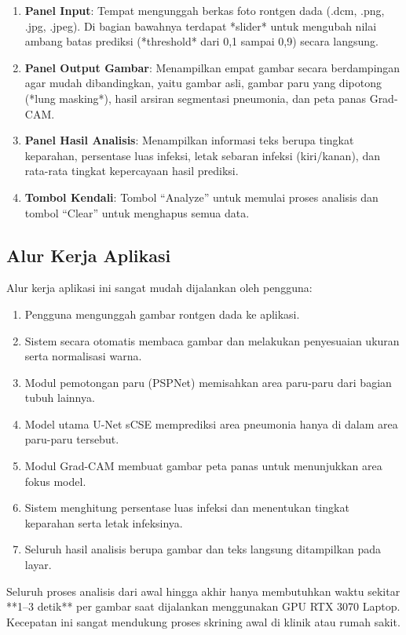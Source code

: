 \documentclass[12pt,a4paper,oneside]{book}
\begin{document}
\begin{enumerate}
  \item \textbf{Panel Input}: Tempat mengunggah berkas foto rontgen dada (.dcm, .png, .jpg, .jpeg). Di bagian bawahnya terdapat *slider* untuk mengubah nilai ambang batas prediksi (*threshold* dari 0,1 sampai 0,9) secara langsung.
  \item \textbf{Panel Output Gambar}: Menampilkan empat gambar secara berdampingan agar mudah dibandingkan, yaitu gambar asli, gambar paru yang dipotong (*lung masking*), hasil arsiran segmentasi pneumonia, dan peta panas Grad-CAM.
  \item \textbf{Panel Hasil Analisis}: Menampilkan informasi teks berupa tingkat keparahan, persentase luas infeksi, letak sebaran infeksi (kiri/kanan), dan rata-rata tingkat kepercayaan hasil prediksi.
  \item \textbf{Tombol Kendali}: Tombol ``Analyze'' untuk memulai proses analisis dan tombol ``Clear'' untuk menghapus semua data.
\end{enumerate}

\subsection{Alur Kerja Aplikasi}

Alur kerja aplikasi ini sangat mudah dijalankan oleh pengguna:
\begin{enumerate}
  \item Pengguna mengunggah gambar rontgen dada ke aplikasi.
  \item Sistem secara otomatis membaca gambar dan melakukan penyesuaian ukuran serta normalisasi warna.
  \item Modul pemotongan paru (PSPNet) memisahkan area paru-paru dari bagian tubuh lainnya.
  \item Model utama U-Net sCSE memprediksi area pneumonia hanya di dalam area paru-paru tersebut.
  \item Modul Grad-CAM membuat gambar peta panas untuk menunjukkan area fokus model.
  \item Sistem menghitung persentase luas infeksi dan menentukan tingkat keparahan serta letak infeksinya.
  \item Seluruh hasil analisis berupa gambar dan teks langsung ditampilkan pada layar.
\end{enumerate}

Seluruh proses analisis dari awal hingga akhir hanya membutuhkan waktu sekitar **1--3 detik** per gambar saat dijalankan menggunakan GPU RTX 3070 Laptop. Kecepatan ini sangat mendukung proses skrining awal di klinik atau rumah sakit.
\end{document}

